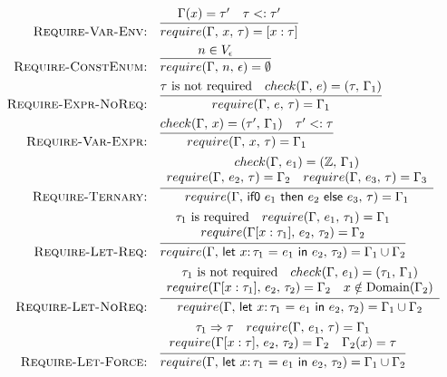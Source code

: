\documentclass[10pt,conference]{IEEEtran}
\newcommand{\Z}{\ensuremath{\mathbb{Z}}}
\newcommand{\lett}[4]{\ensuremath{\mathsf{let}\ #1\mathsf{:}\,#2\ \mathsf{=}\ #3\ \mathsf{in}\ #4}}
\newcommand{\ternary}[3]{\ensuremath{\mathsf{if0}\ #1\ \mathsf{then}\ #2\ \mathsf{else}\ #3}}
\newcommand{\checktype}[4]{\ensuremath{{check}(#1,\,#2)=(#3,\,#4)}}
\newcommand{\requiretype}[4]{\ensuremath{{require}(#1,\,#2,\,#3)=#4}}
\newcommand{\required}[1]{\ensuremath{#1\text{ is required}}}
\newcommand{\nrequired}[1]{\ensuremath{#1\text{ is not required}}}
\newcommand{\forcerequire}[2]{\ensuremath{#1\Rightarrow#2}}
\begin{document}
\begin{figure*}[ht]
\centering
\begin{framed}
\begin{align*}
\text{\textsc{Require-Var-Env:}} &\quad \infer{\requiretype{\Gamma}{x}{\tau}{[x:\tau]}}{\Gamma(x) = \tau' \quad \tau <: \tau'} \\
\text{\textsc{Require-ConstEnum:}} &\quad \infer{\requiretype{\Gamma}{n}{\epsilon}{\emptyset}}{n \in V_\epsilon} \\
\text{\textsc{Require-Expr-NoReq:}} &\quad \infer{\requiretype{\Gamma}{e}{\tau}{\Gamma_1}}{\nrequired{\tau} \quad \checktype{\Gamma}{e}{\tau}{\Gamma_1}} \\
\text{\textsc{Require-Var-Expr:}} &\quad \infer{\requiretype{\Gamma}{x}{\tau}{\Gamma_1}}{\checktype{\Gamma}{x}{\tau'}{\Gamma_1} \quad \tau' <: \tau} \\
\text{\textsc{Require-Ternary:}} &\quad \infer{\requiretype{\Gamma}{\ternary{e_1}{e_2}{e_3}}{\tau}{\Gamma_1}}{
\begin{array}{c}
\checktype{\Gamma}{e_1}{\Z}{\Gamma_1} \\
\requiretype{\Gamma}{e_2}{\tau}{\Gamma_2} \quad \requiretype{\Gamma}{e_3}{\tau}{\Gamma_3}
\end{array}
} \\
\text{\textsc{Require-Let-Req:}} &\quad \infer{\requiretype{\Gamma}{\lett{x}{\tau_1}{e_1}{e_2}}{\tau_2}{\Gamma_1 \cup \Gamma_2}}{
\begin{array}{c}
\required{\tau_1} \quad \requiretype{\Gamma}{e_1}{\tau_1}{\Gamma_1} \\
\requiretype{\Gamma[x:\tau_1]}{e_2}{\tau_2}{\Gamma_2}
\end{array}
} \\
\text{\textsc{Require-Let-NoReq:}} &\quad \infer{\requiretype{\Gamma}{\lett{x}{\tau_1}{e_1}{e_2}}{\tau_2}{\Gamma_1 \cup \Gamma_2}}{
\begin{array}{c}
\nrequired{\tau_1} \quad \checktype{\Gamma}{e_1}{\tau_1}{\Gamma_1} \\
\requiretype{\Gamma[x:\tau_1]}{e_2}{\tau_2}{\Gamma_2} \quad x \notin \text{Domain}(\Gamma_2)
\end{array}
} \\
\text{\textsc{Require-Let-Force:}} &\quad \infer{\requiretype{\Gamma}{\lett{x}{\tau_1}{e_1}{e_2}}{\tau_2}{\Gamma_1 \cup \Gamma_2}}{
\begin{array}{c}
\forcerequire{\tau_1}{\tau} \quad \requiretype{\Gamma}{e_1}{\tau}{\Gamma_1} \\
\requiretype{\Gamma[x:\tau]}{e_2}{\tau_2}{\Gamma_2} \quad \Gamma_2(x) = \tau

\end{array}}
\end{align*}
\end{framed}
\end{figure*}
\end{document}
